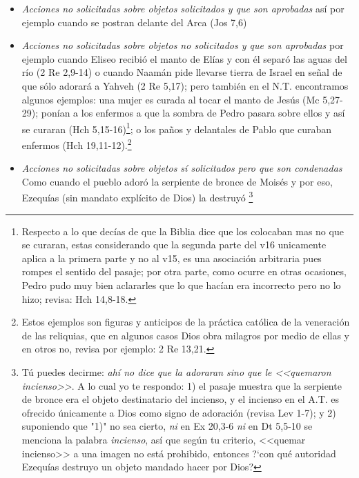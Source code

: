 \documentclass{article}
\begin{document}
\begin{itemize}
\item \emph{Acciones no solicitadas sobre objetos solicitados y que son aprobadas} as\'{i} por ejemplo cuando se postran delante del Arca (Jos 7,6)

\item \emph{Acciones no solicitadas sobre objetos no solicitados y que son aprobadas} por ejemplo cuando Eliseo recibi\'o el manto de El\'{i}as y con \'el separ\'o las aguas del r\'{i}o (2 Re 2,9-14) o cuando Naam\'an pide llevarse tierra de Israel en se\~nal de que s\'olo adorar\'a a Yahveh (2 Re 5,17); pero tambi\'en en el N.T. encontramos algunos ejemplos: una mujer es curada al tocar el manto de Jes\'us (Mc 5,27-29); pon\'{i}an a los enfermos a que la sombra de Pedro pasara sobre ellos y as\'{i} se curaran (Hch 5,15-16)\footnote{Respecto a lo que dec\'{i}as de que la Biblia dice que los colocaban mas no que se curaran, estas considerando que la segunda parte del v16 unicamente aplica a la primera parte y no al v15, es una asociaci\'on arbitraria pues rompes el sentido del pasaje; por otra parte, como ocurre en otras ocasiones, Pedro pudo muy bien aclararles que lo que hac\'{i}an era incorrecto pero no lo hizo; revisa: Hch 14,8-18.}; o los pa\~nos y delantales de Pablo que curaban enfermos (Hch 19,11-12).\footnote{Estos ejemplos son figuras y anticipos de la pr\'actica cat\'olica de la veneraci\'on de las reliquias, que en algunos casos Dios obra milagros por medio de ellas y en otros no, revisa por ejemplo: 2 Re 13,21.}

\item \emph{Acciones no solicitadas sobre objetos s\'{i} solicitados pero que son condenadas} Como cuando el pueblo ador\'o la serpiente de bronce de Mois\'es y por eso, Ezequ\'{i}as (sin mandato expl\'{i}cito de Dios) la destruy\'o%
    \footnote{T\'u puedes decirme: \emph{ah\'{i} no dice que la adoraran sino que le <<quemaron incienso>>}. A lo cual yo te respondo: 1) el pasaje muestra que la serpiente de bronce era el objeto destinatario del incienso, y el incienso en el A.T. es ofrecido \'unicamente a Dios como signo de adoraci\'on (revisa Lev 1-7); y 2) suponiendo que "1)" no sea cierto, \emph{ni} en Ex 20,3-6 \emph{ni} en Dt 5,5-10 se menciona la palabra \emph{incienso}, as\'{i} que seg\'un tu criterio, <<quemar incienso>> a una imagen no est\'a prohibido, entonces ?`con qu\'e autoridad Ezequ\'{i}as destruyo un objeto mandado hacer por Dios?}
\end{itemize}
\end{document}

